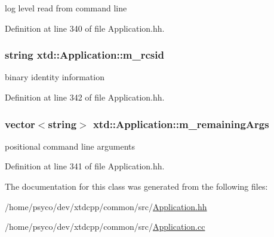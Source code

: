 log level read from command line 



Definition at line 340 of file Application.\+hh.

\subsubsection[{\texorpdfstring{m\+\_\+rcsid}{m_rcsid}}]{\setlength{\rightskip}{0pt plus 5cm}string xtd\+::\+Application\+::m\+\_\+rcsid\hspace{0.3cm}{\ttfamily [protected]}}\hypertarget{classxtd_1_1Application_ad820953bc15b729ce010f422595d3a3f}{}\label{classxtd_1_1Application_ad820953bc15b729ce010f422595d3a3f}


binary identity information 



Definition at line 342 of file Application.\+hh.

\subsubsection[{\texorpdfstring{m\+\_\+remaining\+Args}{m_remainingArgs}}]{\setlength{\rightskip}{0pt plus 5cm}vector$<$string$>$ xtd\+::\+Application\+::m\+\_\+remaining\+Args\hspace{0.3cm}{\ttfamily [protected]}}\hypertarget{classxtd_1_1Application_a7651fd3849530cdded556187a6b42c25}{}\label{classxtd_1_1Application_a7651fd3849530cdded556187a6b42c25}


positional command line arguments 



Definition at line 341 of file Application.\+hh.



The documentation for this class was generated from the following files\+:\begin{DoxyCompactItemize}
\item 
/home/psyco/dev/xtdcpp/common/src/\hyperlink{src_2Application_8hh}{Application.\+hh}\item 
/home/psyco/dev/xtdcpp/common/src/\hyperlink{Application_8cc}{Application.\+cc}\end{DoxyCompactItemize}
